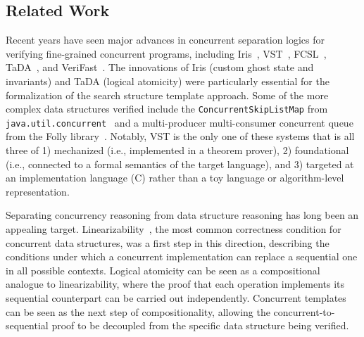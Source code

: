 \documentclass[a4paper,UKenglish,cleveref, autoref, thm-restate]{lipics-v2021}
\begin{document}
\subsection*{Related Work}
Recent years have seen major advances in concurrent separation logics for verifying fine-grained concurrent programs, including Iris~\cite{iris}, VST~\cite{plcc,iris-vst-arxiv}, FCSL~\cite{fcsl}, TaDA~\cite{tada}, and VeriFast~\cite{verifast-conc}. The innovations of Iris (custom ghost state and invariants) and TaDA (logical atomicity) were particularly essential for the formalization of the search structure template approach. Some of the more complex data structures verified include the \lstinline{ConcurrentSkipListMap} from \lstinline{java.util.concurrent}~\cite{Xiong2017Abstract} and a multi-producer multi-consumer concurrent queue from the Folly library~\cite{iris-folly}. Notably, VST is the only one of these systems that is all three of 1) mechanized (i.e., implemented in a theorem prover), 2) foundational (i.e., connected to a formal semantics of the target language), and 3) targeted at an implementation language (C) rather than a toy language or algorithm-level representation. %


Separating concurrency reasoning from data structure reasoning has long been an appealing target. Linearizability~\cite{linearizability}, the most common correctness condition for concurrent data structures, was a first step in this direction, describing the conditions under which a concurrent implementation can replace a sequential one in all possible contexts. Logical atomicity can be seen as a compositional analogue to linearizability, where the proof that each operation implements its sequential counterpart can be carried out independently. Concurrent templates can be seen as the next step of compositionality, allowing the concurrent-to-sequential proof to be decoupled from the specific data structure being verified.
\end{document}
